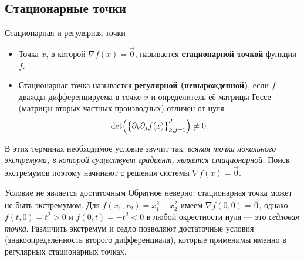 \subsection*{Стационарные точки}

\begin{Definition}{Стационарная и регулярная точки}{}
	\begin{itemize}
		\item Точка $x$, в которой $\nabla f(x)=\vec 0$, называется
		\textbf{стационарной точкой} функции $f$.
		\item Стационарная точка называется \textbf{регулярной (невырожденной)}, если
		$f$ дважды дифференцируема в точке $x$ и определитель её матрицы Гессе
		(матрицы вторых частных производных) отличен от нуля:
		\[
		\det\Bigl(\bigl\{\partial_k\partial_j f(x)\bigr\}_{k,j=1}^{d}\Bigr)\ne 0.
		\]
	\end{itemize}
\end{Definition}

В этих терминах необходимое условие звучит так: \emph{всякая точка локального
экстремума, в которой существует градиент, является стационарной.} Поиск экстремумов
поэтому начинают с решения системы $\nabla f(x)=\vec 0$.

\begin{Remark}{Условие не является достаточным}{}
	Обратное неверно: стационарная точка может не быть экстремумом. Для
	$f(x_1,x_2)=x_1^2-x_2^2$ имеем $\nabla f(0,0)=\vec 0$, однако $f(t,0)=t^2>0$ и
	$f(0,t)=-t^2<0$ в любой окрестности нуля --- это \emph{седловая точка}. Различить
	экстремум и седло позволяют достаточные условия (знакоопределённость второго
	дифференциала), которые применимы именно в регулярных стационарных точках.
\end{Remark}
